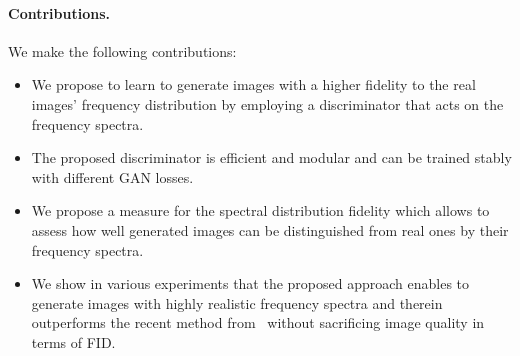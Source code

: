 \documentclass[letterpaper]{article} %
\begin{document}
\paragraph{Contributions.} We make the following contributions:
\begin{itemize}
    \item We propose to learn to generate images with a higher fidelity to the real images' frequency distribution by employing a discriminator that acts on the frequency spectra.
    \item The proposed discriminator is efficient and modular and can be trained stably with different GAN losses.
    \item We propose a measure for the spectral distribution fidelity which allows to assess how well generated images can be distinguished from real ones by their frequency spectra.
    \item We show in various experiments that the proposed approach enables to generate images with highly realistic frequency spectra and therein outperforms the recent method from~\cite{margret2020upconvolution} without sacrificing image quality in terms of FID.
\end{itemize}
\end{document}
